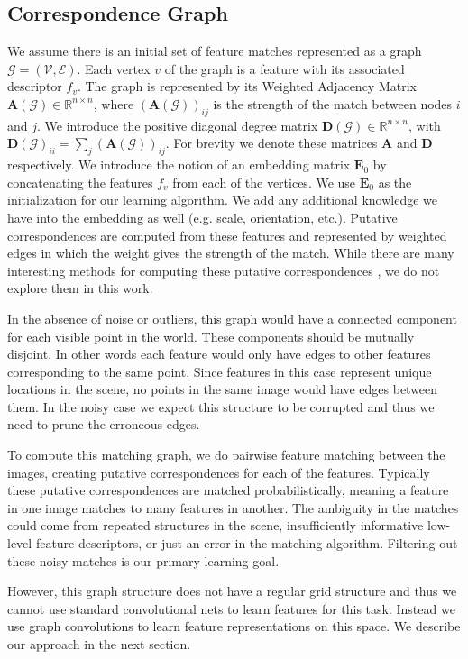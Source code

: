 \documentclass[10pt,twocolumn,letterpaper]{article}
\newcommand{\bR}{\mathbb{R}}
\newcommand{\mat}[1]{\mathbf{#1}}
\begin{document}
\subsection{Correspondence Graph}
We assume there is an initial set of feature matches represented as a graph $\mathcal{G} = (\mathcal{V}, \mathcal{E})$.
Each vertex $v$ of the graph is a feature with its associated descriptor $f_v$. 
The graph is represented by its Weighted Adjacency Matrix $\mat{A}(\mathcal{G}) \in \bR^{n \times n}$, where $(\mat{A}(\mathcal{G}))_{ij}$ is the strength of the match between nodes $i$ and $j$.
We introduce the positive diagonal degree matrix $\mat{D}(\mathcal{G}) \in \bR^{n \times n}$, with $\mat{D}(\mathcal{G})_{ii} = \sum_j (\mat{A}(\mathcal{G}))_{ij}$.
For brevity we denote these matrices $\mat{A}$ and $\mat{D}$ respectively.
We introduce the notion of an embedding matrix $\mat{E}_0$ by concatenating the features $f_v$ from each of the vertices.
We use $\mat{E}_0$ as the initialization for our learning algorithm.
We add any additional knowledge we have into the embedding as well (e.g. scale, orientation, etc.).
Putative correspondences are computed from these features and represented by weighted edges in which the weight gives the strength of the match.
While there are many interesting methods for computing these putative correspondences \cite{suh2015subgraph, yi2018learning}, we do not explore them in this work.

In the absence of noise or outliers, this graph would have a connected component for each visible point in the world.
These components should be mutually disjoint. 
In other words each feature would only have edges to other features corresponding to the same point.
Since features in this case represent unique locations in the scene, no points in the same image would have edges between them.
In the noisy case we expect this structure to be corrupted and thus we need to prune the erroneous edges.

To compute this matching graph, we do pairwise feature matching between the images, creating putative correspondences for each of the features.
Typically these putative correspondences are matched probabilistically, meaning a feature in one image matches to many features in another.
The ambiguity in the matches could come from repeated structures in the scene, insufficiently informative low-level feature descriptors, or just an error in the matching algorithm.
Filtering out these noisy matches is our primary learning goal.

However, this graph structure does not have a regular grid structure and thus we cannot use standard convolutional nets to learn features for this task.
Instead we use graph convolutions to learn feature representations on this space.
We describe our approach in the next section.
\end{document}
